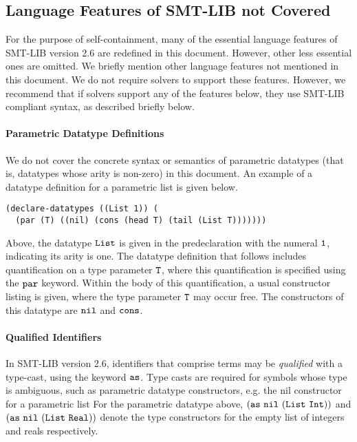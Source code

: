 \documentclass[english,a4paper,10pt]{article}
\begin{document}
\begin{appendix}
\section{Language Features of SMT-LIB not Covered}

For the purpose of self-containment,
many of the essential language features of SMT-LIB version 2.6
are redefined in this document.
However, other less essential ones are omitted.
We briefly mention other language features not mentioned in
this document.
We do not require solvers to support these features.
However, we recommend that if solvers support any of the features below,
they use SMT-LIB compliant syntax, as described briefly below.

\paragraph{Parametric Datatype Definitions}
We do not cover the concrete syntax or semantics of parametric datatypes (that
is, datatypes whose arity is non-zero) in this document.
An example of a datatype definition for a parametric list is given below.
\begin{lstlisting}[basicstyle={\ttfamily}]
(declare-datatypes ((List 1)) (
  (par (T) ((nil) (cons (head T) (tail (List T)))))))
\end{lstlisting}
Above, the datatype ${\tt List}$ 
is given in the predeclaration with the numeral ${\tt 1}$, indicating
its arity is one.
The datatype definition that follows includes quantification on a type
parameter ${\tt T}$, where this quantification is specified using the 
${\tt par}$ keyword. Within the body of this quantification,
a usual constructor listing is given, where the type parameter ${\tt T}$
may occur free. The constructors of this datatype are ${\tt nil}$
and ${\tt cons}$.

\paragraph{Qualified Identifiers}
In SMT-LIB version 2.6,
identifiers that comprise terms
may be \emph{qualified} with a type-cast, using the keyword ${\tt as}$.
Type casts are required for symbols whose type is ambiguous,
such as parametric datatype constructors, e.g. the nil constructor
for a parametric list
For the parametric datatype above, 
${\tt (as\ nil\ (List\ Int))}$ and ${\tt (as\ nil\ (List\ Real))}$ 
denote the type constructors
for the empty list of integers and reals respectively.


\end{appendix}
\end{document}
